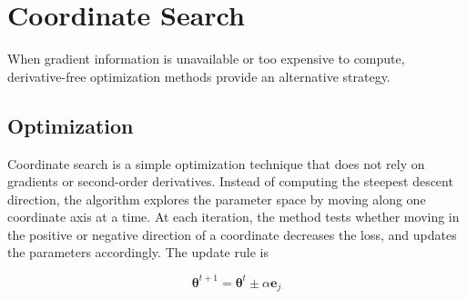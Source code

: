 \documentclass{article}
\newcommand{\vecb}[1]{\boldsymbol{#1}} %
\newcommand{\vb}[1]{\mathbf{#1}}       %
\begin{document}




\section{Coordinate Search}

When gradient information is unavailable or too expensive to compute, derivative-free optimization methods provide an alternative strategy.

\subsection{Optimization}

Coordinate search is a simple optimization technique that does not rely on gradients or second-order derivatives. Instead of computing the steepest descent direction, the algorithm explores the parameter space by moving along one coordinate axis at a time. At each iteration, the method tests whether moving in the positive or negative direction of a coordinate decreases the loss, and updates the parameters accordingly. The update rule is

\[
\vecb{\theta}^{t+1}
=
\vecb{\theta}^{t}
\pm \alpha \vb{e}_j
\]
\end{document}
